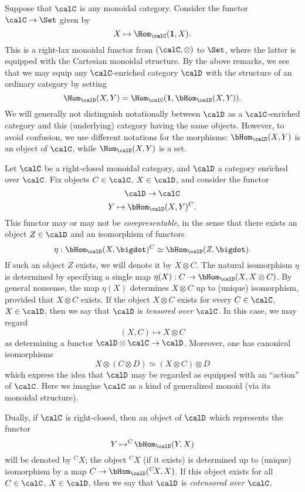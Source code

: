 Suppose that $\calC$ is any monoidal category. Consider the functor $\calC \rightarrow \Set$ given by
$$ X \mapsto \Hom_{\calC}( { \bf 1}, X).$$
This is a right-lax monoidal functor from $(\calC, \otimes)$ to $\Set$, where the latter is equipped with the Cartesian monoidal structure. By the above remarks, we see that we may equip any $\calC$-enriched category $\calD$ with the structure of an ordinary category by setting
$$ \Hom_{\calD}(X,Y) = \Hom_{\calC}( {\bf 1}, \bHom_{\calD}(X,Y) ).$$ 
We will generally not distinguish notationally between $\calD$ as a $\calC$-enriched category
and this (underlying) category having the same objects. However, to avoid confusion, we use different notations for the morphisms: $\bHom_{\calD}(X,Y)$ is an object of $\calC$, while $\Hom_{\calD}(X,Y)$ is a set.

Let $\calC$ be a right-closed monoidal category, and $\calD$ a category enriched over $\calC$.
Fix objects $C \in \calC$, $X \in \calD$, and consider the functor
$$ \calD \rightarrow \calC$$
$$ Y \mapsto \bHom_{\calD}(X,Y)^{C}.$$
This functor may or may not be {\em corepresentable}, in the sense that there exists an object
$Z \in \calD$ and an isomorphism of functors
$$ \eta: \bHom_{\calD}(X, \bigdot)^{C} \simeq \bHom_{\calD}(Z, \bigdot).$$
If such an object $Z$ exists, we will denote it by $X \otimes C$. The natural isomorphism $\eta$ is determined by specifying a single map $\eta(X): C \rightarrow \bHom_{\calD}(X, X \otimes C)$. By general nonsense, the map $\eta(X)$ determines $X \otimes C$ up to (unique) isomorphism, provided that $X \otimes C$ exists. If the object $X \otimes C$ exists for every $C \in \calC$, $X \in \calD$, then we say that $\calD$ is {\it tensored over $\calC$}. In this case, we may regard $$(X,C) \mapsto X \otimes C$$
as determining a functor $\calD \otimes \calC \rightarrow \calD$. Moreover, one has canonical
isomorphisms $$X \otimes (C \otimes D) \simeq (X \otimes C) \otimes D$$
which express the idea that $\calD$ may be regarded as equipped with an ``action'' of $\calC$. Here we imagine $\calC$ as a kind of generalized monoid (via its monoidal structure).

Dually, if $\calC$ is right-closed, then an object of $\calD$ which represents the functor
$$ Y \mapsto ^{C}\!\bHom_{\calD}(Y,X)$$
will be denoted by $^{C}\!X$; the object $^{C}\!X$ (if it exists) is determined up to (unique) isomorphism by a map $C \rightarrow \bHom_{\calD}(^{C}\!X,X)$. 
If this object exists for all $C \in \calC$, $X \in \calD$, then we say that
$\calD$ is {\it cotensored over $\calC$}.


